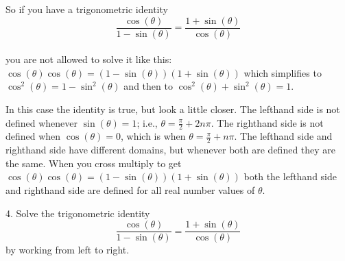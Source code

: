 \documentclass[12pt]{article}
\begin{document}
So if you have a trigonometric identity
 \[\frac{\cos(\theta)}{1-\sin(\theta)}=\frac{1+\sin(\theta)}{\cos(\theta)}\] \\
you are not allowed to solve it like this:\\
$\cos(\theta)\cos(\theta)= (1-\sin(\theta))(1+\sin(\theta))$ which simplifies to $\cos^2(\theta)= 1-\sin^2(\theta)$ and then to $\cos^2(\theta)+ \sin^2(\theta)=1$. 

In this case the identity is true, but look a little closer. The lefthand side is not defined whenever
$\sin(\theta)=1$; i.e., $\theta= \frac{\pi}{2} + 2n\pi$. The righthand side is not defined when 
$\cos(\theta)=0$, which is when $\theta= \frac{\pi}{2} + n\pi$. The lefthand side and righthand side have
different domains, but whenever both are defined they are the same. When you cross multiply to get
$\cos(\theta)\cos(\theta)=(1-\sin(\theta))(1+\sin(\theta))$ both the lefthand side and righthand side are
defined for all real number values of $\theta$. 

4. Solve the trigonometric identity
\[\frac{\cos(\theta)}{1-\sin(\theta)}=\frac{1+\sin(\theta)}{\cos(\theta)}\] 
by working from left to right.
\end{document}
